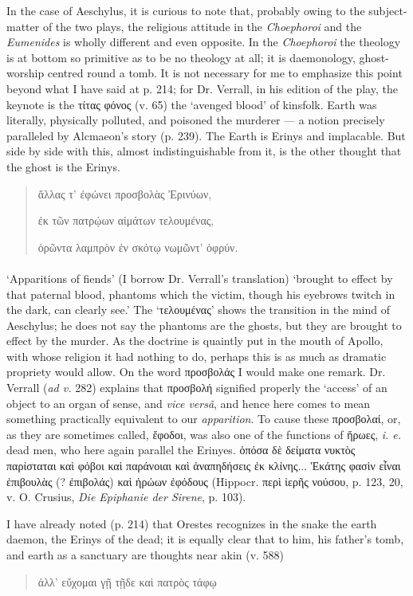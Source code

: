 \documentclass[a4paper, 11pt, oneside, polutonikogreek, english]{article}
\begin{document}
In the case of Aeschylus, it is curious to note that, probably owing to the subject-matter of the two plays, the religious attitude in the \emph{Choephoroi} and the \emph{Eumenides} is wholly different and even opposite. In the \emph{Choephoroi} the theology is at bottom so primitive as to be no theology at all; it is daemonology, ghost-worship centred round a tomb. It is not necessary for me to emphasize this point beyond what I have said at p. 214; for Dr. Verrall, in his edition of the play, the keynote is the τίτας φόνος (v. 65) the `avenged blood' of kinsfolk. Earth was literally, physically polluted, and poisoned the murderer --- a notion precisely paralleled by Alcmaeon's story (p. 239). The Earth is Erinys and implacable. But side by side with this, almost indistinguishable from it, is the other thought that the ghost is the Erinys.
\begin{quotation}
\large
ἄλλας τ' ἐφώνει προσβολὰς Ἐρινύων,

ἐκ τῶν πατρῴων αἱμάτων τελουμένας,

ὁρῶντα λαμπρὸν ἐν σκότῳ νωμῶντ' ὀφρύν.
\end{quotation}
\paragraph{}
`Apparitions of fiends' (I borrow Dr. Verrall's translation) `brought to effect by that paternal blood, phantoms which the victim, though his eyebrows twitch in the dark, can clearly see.' The `τελουμένας' shows the transition in the mind of Aeschylus; he does not say the phantoms are the ghosts, but they are brought to effect by the murder. As the doctrine is quaintly put in the mouth of Apollo, with whose religion it had nothing to do, perhaps this is as much as dramatic propriety would allow. On the word προσβολάς I would make one remark. Dr. Verrall (\emph{ad v.} 282) explains that προσβολή signified properly the `access' of an object to an organ of sense, and \emph{vice versâ}, and hence here comes to mean something practically equivalent to our \emph{apparition}. To cause these προσβολαί, or, as they are sometimes called, ἔφοδοι, was also one of the functions of ἥρωες, \emph{i. e.} dead men, who here again parallel the Erinyes. ὁπόσα δὲ δείματα νυκτὸς παρίσταται καὶ φόβοι καὶ παράνοιαι καὶ ἀναπηδήσεις ἐκ κλίνης... Ἑκάτης φασὶν εἶναι ἐπιβουλὰς (? ἐπιβολάς) καὶ ἡρώων ἐφόδους (Hippocr. περὶ ἱερῆς νούσου, p. 123, 20, v. O. Crusius, \emph{Die Epiphanie der Sirene}, p. 103).

I have already noted (p. 214) that Orestes recognizes in the snake the earth daemon, the Erinys of the dead; it is equally clear that to him, his father's tomb, and earth as a sanctuary are thoughts near akin (v. 588)
\begin{quotation}
\large
ἀλλ' εὔχομαι γῇ τῇδε καὶ πατρὸς τάφῳ
\end{quotation}
\end{document}
